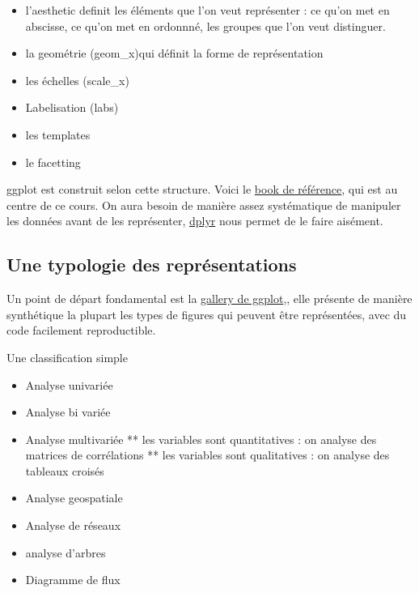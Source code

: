 \documentclass[
]{book}
\providecommand{\tightlist}{%
  \setlength{\itemsep}{0pt}\setlength{\parskip}{0pt}}
\begin{document}
\begin{itemize}
\tightlist
\item
  l'aesthetic definit les éléments que l'on veut représenter : ce qu'on met en abscisse, ce qu'on met en ordonnné, les groupes que l'on veut distinguer.
\item
  la geométrie (geom\_x)qui définit la forme de représentation
\item
  les échelles (scale\_x)
\item
  Labelisation (labs)
\item
  les templates
\item
  le facetting
\end{itemize}

ggplot est construit selon cette structure. Voici le \href{https://ggplot2-book.org/}{book de référence}, qui est au centre de ce cours. On aura besoin de manière assez systématique de manipuler les données avant de les représenter, \href{http://larmarange.github.io/analyse-R/manipuler-les-donnees-avec-dplyr.html}{dplyr} nous permet de le faire aisément.

\hypertarget{une-typologie-des-repruxe9sentations}{%
\subsection{Une typologie des représentations}\label{une-typologie-des-repruxe9sentations}}

Un point de départ fondamental est la \href{https://www.r-graph-gallery.com/}{gallery de ggplot},, elle présente de manière synthétique la plupart les types de figures qui peuvent être représentées, avec du code facilement reproductible.

Une classification simple

\begin{itemize}
\tightlist
\item
  Analyse univariée
\item
  Analyse bi variée
\item
  Analyse multivariée
  ** les variables sont quantitatives : on analyse des matrices de corrélations
  ** les variables sont qualitatives : on analyse des tableaux croisés
\item
  Analyse geospatiale
\item
  Analyse de réseaux
\item
  analyse d'arbres
\item
  Diagramme de flux
\end{itemize}
\end{document}
